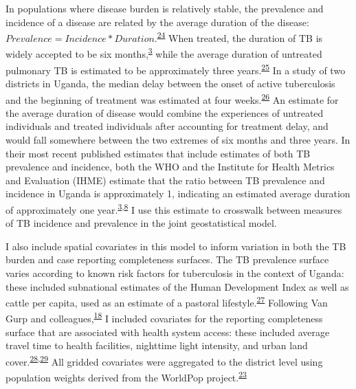 \documentclass[
]{article}
\begin{document}
In populations where disease burden is relatively stable, the prevalence and incidence of a disease are related by the average duration of the disease: \(Prevalence = Incidence * Duration\).\textsuperscript{\protect\hyperlink{ref-Freeman1980}{24}} When treated, the duration of TB is widely accepted to be six months,\textsuperscript{\protect\hyperlink{ref-WorldHealthOrganization2019}{3}} while the average duration of untreated pulmonary TB is estimated to be approximately three years.\textsuperscript{\protect\hyperlink{ref-Tiemersma2011}{25}} In a study of two districts in Uganda, the median delay between the onset of active tuberculosis and the beginning of treatment was estimated at four weeks.\textsuperscript{\protect\hyperlink{ref-Buregyeya2014}{26}} An estimate for the average duration of disease would combine the experiences of untreated individuals and treated individuals after accounting for treatment delay, and would fall somewhere between the two extremes of six months and three years. In their most recent published estimates that include estimates of both TB prevalence and incidence, both the WHO and the Institute for Health Metrics and Evaluation (IHME) estimate that the ratio between TB prevalence and incidence in Uganda is approximately 1, indicating an estimated average duration of approximately one year.\textsuperscript{\protect\hyperlink{ref-WorldHealthOrganization2019}{3},\protect\hyperlink{ref-Kyu2018}{8}} I use this estimate to crosswalk between measures of TB incidence and prevalence in the joint geostatistical model.

I also include spatial covariates in this model to inform variation in both the TB burden and case reporting completeness surfaces. The TB prevalence surface varies according to known risk factors for tuberculosis in the context of Uganda: these included subnational estimates of the Human Development Index as well as cattle per capita, used as an estimate of a pastoral lifestyle.\textsuperscript{\protect\hyperlink{ref-UgandaNationalTuberculosisandLeprosyProgramme2020a}{27}} Following Van Gurp and colleagues,\textsuperscript{\protect\hyperlink{ref-VanGurp2020}{18}} I included covariates for the reporting completeness surface that are associated with health system access: these included average travel time to health facilities, nighttime light intensity, and urban land cover.\textsuperscript{\protect\hyperlink{ref-Weiss2020}{28},\protect\hyperlink{ref-Thomson2019}{29}} All gridded covariates were aggregated to the district level using population weights derived from the WorldPop project.\textsuperscript{\protect\hyperlink{ref-Tatem2017}{23}}
\end{document}
